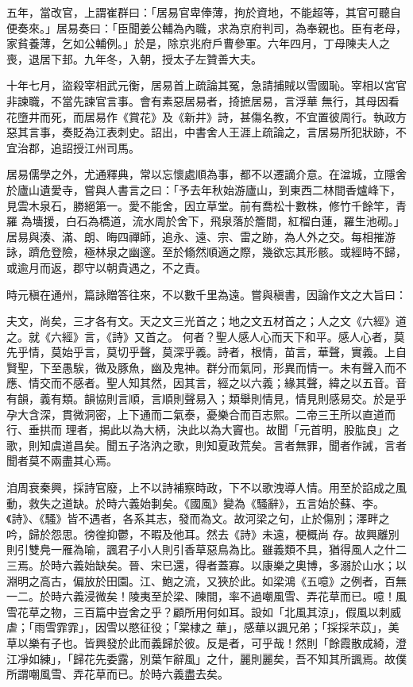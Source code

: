 \begin{pinyinscope}
 五年，當改官，上謂崔群曰：「居易官卑俸薄，拘於資地，不能超等，其官可聽自便奏來。」居易奏曰：「臣聞姜公輔為內職，求為京府判司，為奉親也。臣有老母，家貧養薄，乞如公輔例。」於是，除京兆府戶曹參軍。六年四月，丁母陳夫人之喪，退居下邽。九年冬，入朝，授太子左贊善大夫。



 十年七月，盜殺宰相武元衡，居易首上疏論其冤，急請捕賊以雪國恥。宰相以宮官非諫職，不當先諫官言事。會有素惡居易者，掎摭居易，言浮華
 無行，其母因看花墮井而死，而居易作《賞花》及《新井》詩，甚傷名教，不宜置彼周行。執政方惡其言事，奏貶為江表刺史。詔出，中書舍人王涯上疏論之，言居易所犯狀跡，不宜治郡，追詔授江州司馬。



 居易儒學之外，尤通釋典，常以忘懷處順為事，都不以遷謫介意。在湓城，立隱舍於廬山遺愛寺，嘗與人書言之曰：「予去年秋始游廬山，到東西二林間香爐峰下，見雲木泉石，勝絕第一。愛不能舍，因立草堂。前有喬松十數株，修竹千餘竿，青羅
 為墻援，白石為橋道，流水周於舍下，飛泉落於簷間，紅榴白蓮，羅生池砌。」居易與湊、滿、朗、晦四禪師，追永、遠、宗、雷之跡，為人外之交。每相摧游詠，躋危登險，極林泉之幽邃。至於翛然順適之際，幾欲忘其形骸。或經時不歸，或逾月而返，郡守以朝貴遇之，不之責。



 時元稹在通州，篇詠贈答往來，不以數千里為遠。嘗與稹書，因論作文之大旨曰：



 夫文，尚矣，三才各有文。天之文三光首之；地之文五材首之；人之文《六經》道之。就《六經》言，《詩》又首之。
 何者？聖人感人心而天下和平。感人心者，莫先乎情，莫始乎言，莫切乎聲，莫深乎義。詩者，根情，苗言，華聲，實義。上自賢聖，下至愚騃，微及豚魚，幽及鬼神。群分而氣同，形異而情一。未有聲入而不應、情交而不感者。聖人知其然，因其言，經之以六義；緣其聲，緯之以五音。音有韻，義有類。韻協則言順，言順則聲易入；類舉則情見，情見則感易交。於是乎孕大含深，貫微洞密，上下通而二氣泰，憂樂合而百志熙。二帝三王所以直道而行、垂拱而
 理者，揭此以為大柄，決此以為大竇也。故聞「元首明，股肱良」之歌，則知虞道昌矣。聞五子洛汭之歌，則知夏政荒矣。言者無罪，聞者作誡，言者聞者莫不兩盡其心焉。



 洎周衰秦興，採詩官廢，上不以詩補察時政，下不以歌洩導人情。用至於諂成之風動，救失之道缺。於時六義始剚矣。《國風》變為《騷辭》，五言始於蘇、李。《詩》、《騷》皆不遇者，各系其志，發而為文。故河梁之句，止於傷別；澤畔之吟，歸於怨思。徬徨抑鬱，不暇及他耳。然去《詩》未遠，梗概尚
 存。故興離別則引雙鳧一雁為喻，諷君子小人則引香草惡鳥為比。雖義類不具，猶得風人之什二三焉。於時六義始缺矣。晉、宋已還，得者蓋寡。以康樂之奧博，多溺於山水；以淵明之高古，偏放於田園。江、鮑之流，又狹於此。如梁鴻《五噫》之例者，百無一二。於時六義浸微矣！陵夷至於梁、陳間，率不過嘲風雪、弄花草而已。噫！風雪花草之物，三百篇中豈舍之乎？顧所用何如耳。設如「北風其涼」，假風以刺威虐；「雨雪霏霏」，因雪以愍征役；「棠棣之
 華」，感華以諷兄弟；「採採芣苡」，美草以樂有子也。皆興發於此而義歸於彼。反是者，可乎哉！然則「餘霞散成綺，澄江凈如練」，「歸花先委露，別葉乍辭風」之什，麗則麗矣，吾不知其所諷焉。故僕所謂嘲風雪、弄花草而已。於時六義盡去矣。




\end{pinyinscope}
